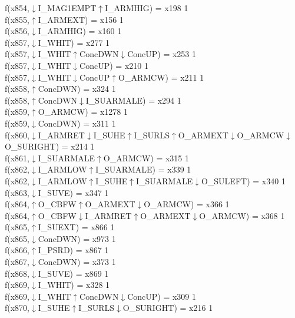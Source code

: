 f(x854,$\downarrow$I\_MAG1EMPT$\uparrow$I\_ARMHIG) = x198 {1} \\
f(x855,$\uparrow$I\_ARMEXT) = x156 {1} \\
f(x856,$\downarrow$I\_ARMHIG) = x160 {1} \\
f(x857,$\downarrow$I\_WHIT) = x277 {1} \\
f(x857,$\downarrow$I\_WHIT$\uparrow$ConcDWN$\downarrow$ConcUP) = x253 {1} \\
f(x857,$\downarrow$I\_WHIT$\downarrow$ConcUP) = x210 {1} \\
f(x857,$\downarrow$I\_WHIT$\downarrow$ConcUP$\uparrow$O\_ARMCW) = x211 {1} \\
f(x858,$\uparrow$ConcDWN) = x324 {1} \\
f(x858,$\uparrow$ConcDWN$\downarrow$I\_SUARMALE) = x294 {1} \\
f(x859,$\uparrow$O\_ARMCW) = x1278 {1} \\
f(x859,$\downarrow$ConcDWN) = x311 {1} \\
f(x860,$\downarrow$I\_ARMRET$\downarrow$I\_SUHE$\uparrow$I\_SURLS$\uparrow$O\_ARMEXT$\downarrow$O\_ARMCW$\downarrow$O\_SURIGHT) = x214 {1} \\
f(x861,$\downarrow$I\_SUARMALE$\uparrow$O\_ARMCW) = x315 {1} \\
f(x862,$\downarrow$I\_ARMLOW$\uparrow$I\_SUARMALE) = x339 {1} \\
f(x862,$\downarrow$I\_ARMLOW$\uparrow$I\_SUHE$\uparrow$I\_SUARMALE$\downarrow$O\_SULEFT) = x340 {1} \\
f(x863,$\downarrow$I\_SUVE) = x347 {1} \\
f(x864,$\uparrow$O\_CBFW$\uparrow$O\_ARMEXT$\downarrow$O\_ARMCW) = x366 {1} \\
f(x864,$\uparrow$O\_CBFW$\downarrow$I\_ARMRET$\uparrow$O\_ARMEXT$\downarrow$O\_ARMCW) = x368 {1} \\
f(x865,$\uparrow$I\_SUEXT) = x866 {1} \\
f(x865,$\downarrow$ConcDWN) = x973 {1} \\
f(x866,$\uparrow$I\_PSRD) = x867 {1} \\
f(x867,$\downarrow$ConcDWN) = x373 {1} \\
f(x868,$\downarrow$I\_SUVE) = x869 {1} \\
f(x869,$\downarrow$I\_WHIT) = x328 {1} \\
f(x869,$\downarrow$I\_WHIT$\uparrow$ConcDWN$\downarrow$ConcUP) = x309 {1} \\
f(x870,$\downarrow$I\_SUHE$\uparrow$I\_SURLS$\downarrow$O\_SURIGHT) = x216 {1} \\
